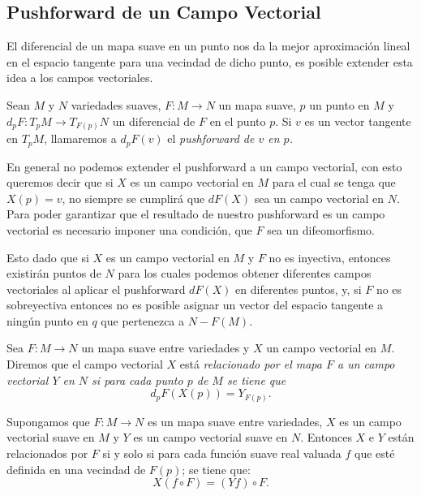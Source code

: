 \subsection{Pushforward de un Campo Vectorial}\label{Subsección: Pushforward de Campos Vectoriales}
El diferencial de un mapa suave en un punto nos da la mejor aproximación lineal en el espacio tangente para una vecindad de dicho punto, es posible extender esta idea a los campos vectoriales.

\begin{definition}[Pushforward]
  Sean $M$ y $N$ variedades suaves, $F: M \to N$ un mapa suave, $p$ un punto en $M$ y $d_pF: T_{p}M \to T_{F(p)}N$ un diferencial de $F$ en el punto $p$. Si $v$ es un vector tangente en $T_p M$, llamaremos a $d_pF(v)$ el \it{pushforward de $v$ en $p$}.
\end{definition}

En general no podemos extender el pushforward a un campo vectorial, con esto queremos decir que si $X$ es un campo vectorial en $M$ para el cual se tenga que $X(p) = v$, no siempre se cumplirá que $dF(X)$ sea un campo vectorial en $N$. Para poder garantizar que el resultado de nuestro pushforward es un campo vectorial es necesario imponer una condición, que $F$ sea un difeomorfismo. 

Esto dado que si $X$ es un campo vectorial en $M$ y $F$ no es inyectiva, entonces existirán puntos de $N$ para los cuales podemos obtener diferentes campos vectoriales al aplicar el pushforward $dF(X)$ en diferentes puntos, y, si $F$ no es sobreyectiva entonces no es posible asignar un vector del espacio tangente a ningún punto en $q$ que pertenezca a $N - F(M)$.

\begin{definition}
	Sea $F: M \to N$ un mapa suave entre variedades y $X$ un campo vectorial en $M$. Diremos que el campo vectorial $X$ está \it{relacionado por el mapa $F$} a un campo vectorial $Y$ en $N$ si para cada punto $p$ de $M$ se tiene que
	\[
		d_pF(X(p)) = Y_{F(p)}.
	\]
\end{definition}

\begin{lemma}
	Supongamos que $F: M \to N$ es un mapa suave entre variedades, $X$ es un campo vectorial suave en $M$ y $Y$ es un campo vectorial suave en $N$. Entonces $X$ e $Y$ están relacionados por $F$ si y solo si para cada función suave real valuada $f$ que esté definida en una vecindad de $F(p)$; se tiene que:
	\[
		X(f \circ F) = (Yf) \circ F.
	\]
\end{lemma}

